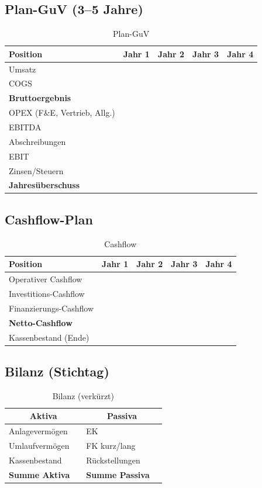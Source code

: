 \documentclass[
%
ngerman %
%
numeric %
]{wbh-assignment}
\begin{document}
\subsection{Plan-GuV (3--5 Jahre)}
\begin{table}[htb!]
\centering
\caption{Plan-GuV}
\begin{tabular}{l r r r r}
\textbf{Position} & \textbf{Jahr 1} & \textbf{Jahr 2} & \textbf{Jahr 3} & \textbf{Jahr 4} \\
\hline
Umsatz & & & & \\
COGS & & & & \\
\textbf{Bruttoergebnis} & & & & \\
OPEX (F\&E, Vertrieb, Allg.) & & & & \\
EBITDA & & & & \\
Abschreibungen & & & & \\
EBIT & & & & \\
Zinsen/Steuern & & & & \\
\textbf{Jahresüberschuss} & & & & \\
\end{tabular}
\end{table}

\subsection{Cashflow-Plan}
\begin{table}[htb!]
\centering
\caption{Cashflow}
\begin{tabular}{l r r r r}
\textbf{Position} & \textbf{Jahr 1} & \textbf{Jahr 2} & \textbf{Jahr 3} & \textbf{Jahr 4} \\
\hline
Operativer Cashflow & & & & \\
Investitions-Cashflow & & & & \\
Finanzierungs-Cashflow & & & & \\
\textbf{Netto-Cashflow} & & & & \\
Kassenbestand (Ende) & & & & \\
\end{tabular}
\end{table}

\subsection{Bilanz (Stichtag)}
\begin{table}[htb!]
\centering
\caption{Bilanz (verkürzt)}
\begin{tabular}{l r l r}
\multicolumn{2}{c}{\textbf{Aktiva}} & \multicolumn{2}{c}{\textbf{Passiva}} \\
\hline
Anlagevermögen & \hspace{6em} & EK & \hspace{6em} \\
Umlaufvermögen & & FK kurz/lang & \\
Kassenbestand & & Rückstellungen & \\
\textbf{Summe Aktiva} & & \textbf{Summe Passiva} & \\
\end{tabular}
\end{table}
\end{document}
